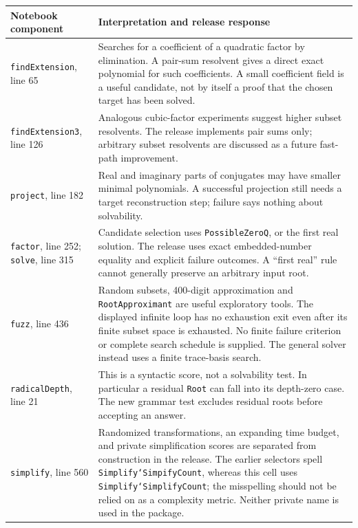 \documentclass[11pt,a4paper]{article}
\newcommand{\code}[1]{\texttt{\small #1}}
\theoremstyle{definition}
\begin{document}
\begin{longtable}{@{}p{}p{}@{}}
\toprule
Notebook component & Interpretation and release response\\
\midrule
\endhead
\code{findExtension}, line 65 & Searches for a coefficient of a quadratic
factor by elimination. A pair-sum resolvent gives a direct exact polynomial for
such coefficients. A small coefficient field is a useful candidate, not by
itself a proof that the chosen target has been solved.\\[4pt]
\code{findExtension3}, line 126 & Analogous cubic-factor experiments suggest
higher subset resolvents. The release implements pair sums only; arbitrary
subset resolvents are discussed as a future fast-path improvement.\\[4pt]
\code{project}, line 182 & Real and imaginary parts of conjugates may have
smaller minimal polynomials. A successful projection still needs a target
reconstruction step; failure says nothing about solvability.\\[4pt]
\code{factor}, line 252; \code{solve}, line 315 & Candidate selection uses
\code{PossibleZeroQ}, or the first real solution. The release uses exact
embedded-number equality and explicit failure outcomes. A ``first real'' rule
cannot generally preserve an arbitrary input root.\\[4pt]
\code{fuzz}, line 436 & Random subsets, 400-digit approximation and
\code{RootApproximant} are useful exploratory tools. The displayed infinite loop
has no exhaustion exit even after its finite subset space is exhausted. No
finite failure criterion or complete search schedule is supplied. The general
solver instead uses a finite trace-basis search.\\[4pt]
\code{radicalDepth}, line 21 & This is a syntactic score, not a solvability test.
In particular a residual \code{Root} can fall into its depth-zero case. The new
grammar test excludes residual roots before accepting an answer.\\[4pt]
\code{simplify}, line 560 & Randomized transformations, an expanding time budget,
and private simplification scores are separated from construction in the release.
The earlier selectors spell \code{Simplify`SimpifyCount}, whereas this cell uses
\code{Simplify`SimplifyCount}; the misspelling should not be relied on as a
complexity metric. Neither private name is used in the package.\\
\bottomrule
\end{longtable}
\end{document}
